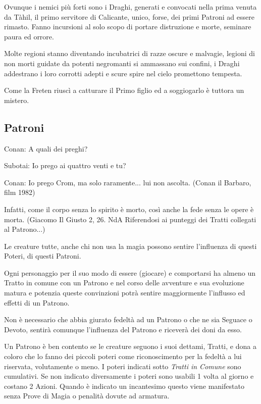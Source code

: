 \begin{multicols}{2}
Ovunque i nemici più forti sono i Draghi, generati e convocati nella prima venuta da Tàhil, il primo servitore di Calicante, unico, forse, dei primi Patroni ad essere rimasto.
Fanno incursioni al solo scopo di portare distruzione e morte, seminare paura ed orrore.

Molte regioni stanno diventando incubatrici di razze oscure e malvagie, legioni di non morti guidate da potenti negromanti si ammassano sui confini, i Draghi addestrano i loro corrotti adepti e scure spire nel cielo promettono tempesta.

Come la Freten riuscì a catturare il Primo figlio ed a soggiogarlo è tuttora un mistero.

\subsection{Patroni}\hypertarget{patroni}{}\label{patroni}

\begin{changemargin}{0.3cm}{0.3cm}\begin{enfasi}{
Conan: A quali dei preghi?

Subotai: Io prego ai quattro venti e tu?

Conan: Io prego Crom, ma solo raramente... lui non ascolta. (Conan il Barbaro, film 1982)

\medskip

Infatti, come il corpo senza lo spirito è morto, così anche la fede senza le opere è morta. (Giacomo Il Giusto 2, 26. NdA Riferendosi ai punteggi dei Tratti collegati al Patrono...)
}
\end{enfasi}\end{changemargin}\medskip

Le creature tutte, anche chi non usa la magia possono sentire l'influenza di questi Poteri, di questi Patroni.

Ogni personaggio per il suo modo di essere (giocare) e comportarsi ha almeno un Tratto in comune con un Patrono e nel corso delle avventure e sua evoluzione matura e potenzia queste convinzioni potrà sentire maggiormente l'influsso ed effetti di un Patrono.

Non è necessario che abbia giurato fedeltà ad un Patrono o che ne sia Seguace o Devoto, sentirà comunque l'influenza del Patrono e riceverà dei doni da esso.

Un Patrono è ben contento se le creature seguono i suoi dettami, Tratti, e dona a coloro che lo fanno dei piccoli poteri come riconoscimento per la fedeltà a lui riservata, volutamente o meno. I poteri indicati sotto \emph{Tratti in Comune} sono cumulativi. Se non indicato diversamente i poteri sono usabili 1 volta al giorno e costano 2 Azioni.
Quando è indicato un incantesimo questo viene manifestato senza Prove di Magia o penalità dovute ad armatura.


\end{multicols}
